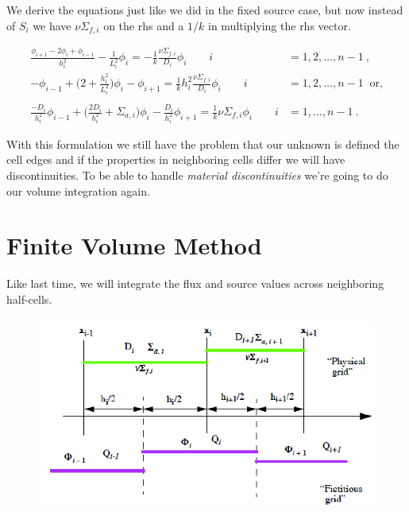 \documentclass[12pt]{article}
\begin{document}
We derive the equations just like we did in the fixed source case, but now instead of $S_i$ we have $\nu \Sigma_{f,i}$ on the rhs and a $1/k$ in multiplying the rhs vector.

\begin{align}
\frac{\phi_{i+1} - 2\phi_i + \phi_{i-1}}{h_i^2} - \frac{1}{L_i^2}\phi_i = -\frac{1}{k}\frac{\nu\Sigma_{f,i}}{D_i}\phi_i \qquad i &= 1, 2, \dots, n-1 \:,\nonumber \\
%
-\phi_{i-1} + \bigl(2 + \frac{h_i^2}{L_i^2}\bigr)\phi_i - \phi_{i+1} = \frac{1}{k} h_i^2 \frac{\nu\Sigma_{f,i}}{D_i}\phi_i \qquad i &= 1, 2, \dots, n-1\: \text{ or,} \nonumber\\
%
\nonumber \\
\frac{-D_i}{h_i^2}\phi_{i-1} + \biggl(\frac{2D_i}{h_i^2} + \Sigma_{a,i} \biggr)\phi_i - \frac{D_i}{h_i^2}\phi_{i+1} = \frac{1}{k} \nu\Sigma_{f,i}\phi_i \qquad i &= 1, \dots, n-1 \:.\nonumber 
\end{align}

With this formulation we still have the problem that our unknown is defined the cell edges and if the properties in neighboring cells differ we will have discontinuities. To be able to handle \textit{material discontinuities} we're going to do our volume integration again.


\section*{Finite Volume Method}

Like last time, we will integrate the flux and source values across neighboring half-cells.
%
\begin{figure}[h!]
\includegraphics[height=2.5in]{FVM-eig-fig}
\end{figure}
\end{document}
